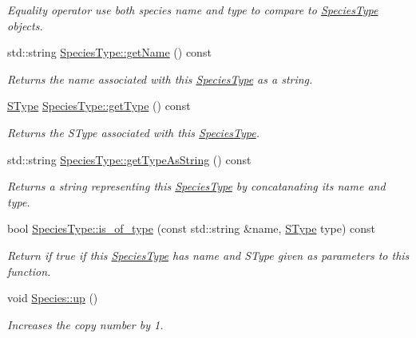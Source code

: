 \begin{DoxyCompactItemize}
\begin{DoxyCompactList}\small\item\em Equality operator use both species name and type to compare to \hyperlink{classSpeciesType}{Species\-Type} objects. \end{DoxyCompactList}\item 
std\-::string \hyperlink{group__Chemistry_gaaf0a4e87ff04118e9b0413bbc26790bb}{Species\-Type\-::get\-Name} () const 
\begin{DoxyCompactList}\small\item\em Returns the name associated with this \hyperlink{classSpeciesType}{Species\-Type} as a string. \end{DoxyCompactList}\item 
\hyperlink{group__Chemistry_ga49104ff0a7d4118feb179c2f1c906f12}{S\-Type} \hyperlink{group__Chemistry_ga32c3dcca6d25d7b1f99abcd33de42019}{Species\-Type\-::get\-Type} () const 
\begin{DoxyCompactList}\small\item\em Returns the S\-Type associated with this \hyperlink{classSpeciesType}{Species\-Type}. \end{DoxyCompactList}\item 
std\-::string \hyperlink{group__Chemistry_gaf24d4e26a72d86c37c86d5c9ce81b5b5}{Species\-Type\-::get\-Type\-As\-String} () const 
\begin{DoxyCompactList}\small\item\em Returns a string representing this \hyperlink{classSpeciesType}{Species\-Type} by concatanating its name and type. \end{DoxyCompactList}\item 
bool \hyperlink{group__Chemistry_ga3af85abdd52aa7e25a1e8321b0fd3cdf}{Species\-Type\-::is\-\_\-of\-\_\-type} (const std\-::string \&name, \hyperlink{group__Chemistry_ga49104ff0a7d4118feb179c2f1c906f12}{S\-Type} type) const 
\begin{DoxyCompactList}\small\item\em Return if true if this \hyperlink{classSpeciesType}{Species\-Type} has name and S\-Type given as parameters to this function. \end{DoxyCompactList}\item 
void \hyperlink{group__Chemistry_gaf2f80e6398e7898a1f2af83445cc08ed}{Species\-::up} ()
\begin{DoxyCompactList}\small\item\em Increases the copy number by 1. \end{DoxyCompactList}\item 

\end{DoxyCompactItemize}
